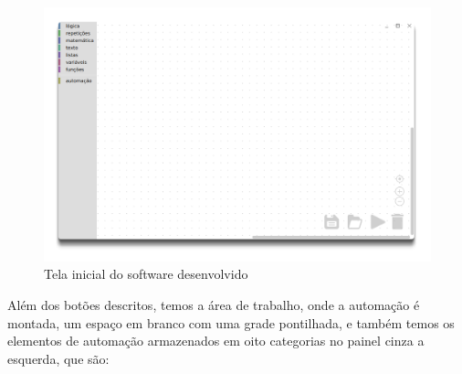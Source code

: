 \documentclass[tg]{mdtufsm}
\begin{document}
                \begin{figure}[!htb]
                    {\centering
                    \includegraphics[width=1.0\textwidth]{imagens/app.png}
                    \caption{Tela inicial do software desenvolvido}
                    \label{fig:app}}
                \end{figure}

                Além dos botões descritos, temos a área de trabalho, onde a automação é montada, um espaço em branco com uma grade pontilhada, e também temos os elementos de automação armazenados em oito categorias no painel cinza a esquerda, que são:
\end{document}
